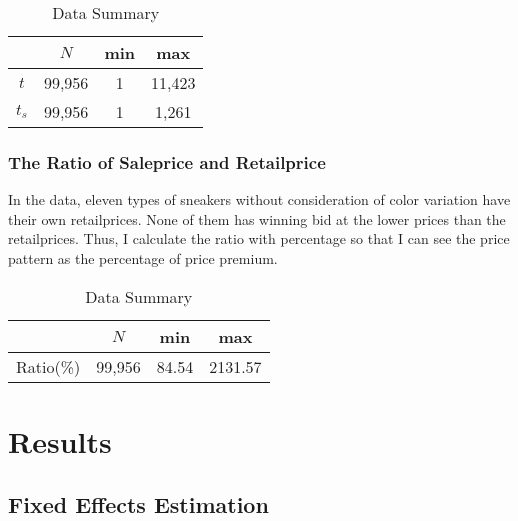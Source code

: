 \documentclass[a4paper]{article}
\theoremstyle{definition}
\theoremstyle{definition}
\theoremstyle{remark}
\begin{document}
\begin{large}
\begin{table}[H]
	\centering
	\caption{Data Summary}
	\begin{tabular}{c|ccc}
		\hline\hline
		& $ N $ & min & max \\\hline
		$ t $ & 99,956  & 1  & 11,423   \\
		$ t_{s} $ & 99,956 & 1 & 1,261 \\
		\hline\hline
	\end{tabular}
	\label{tab4;table4}
\end{table}

\subsubsection{The Ratio of Saleprice and Retailprice}

In the data, eleven types of sneakers without consideration of color variation have their own retailprices. None of them has winning bid at the lower prices than the retailprices. Thus, I calculate the ratio with percentage so that I can see the price pattern as the percentage of price premium.

\begin{table}[H]
	\centering
	\caption{Data Summary}
	\begin{tabular}{c|ccc}
		\hline\hline
		& $ N $ & min & max \\\hline
		Ratio(\%) & 99,956  & 84.54  & 2131.57   \\
		\hline\hline
	\end{tabular}
	\label{tab5;table5}
\end{table}



\section{Results}

\subsection{Fixed Effects Estimation}


\end{large}
\end{document}
